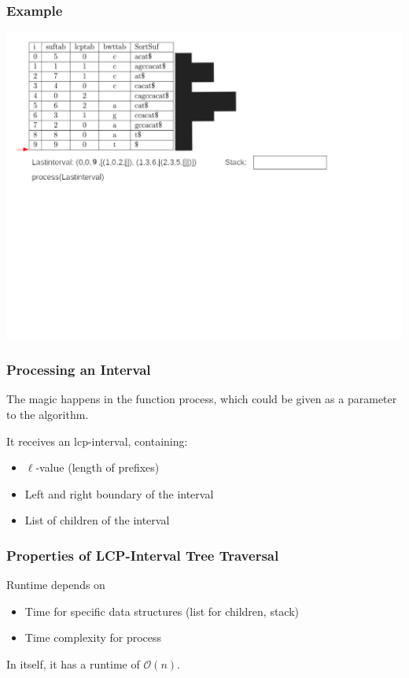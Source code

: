 \documentclass[compress,handout]{beamer} %
\renewcommand{\O}{\mathcal{O}}
\begin{document}
\begin{frame}
	\frametitle{Example}
	\includegraphics[width=\textwidth, height=\textheight, keepaspectratio=true]{traversal_15}
\end{frame}

\begin{frame}
	\frametitle{Processing an Interval}
	The magic happens in the function process, which could be given
	as a parameter to the algorithm.

	It receives an lcp-interval, containing:
	\begin{itemize}
		\item $\ell$-value (length of prefixes)
		\item Left and right boundary of the interval
		\item List of children of the interval
	\end{itemize}
\end{frame}

\begin{frame}
	\frametitle{Properties of LCP-Interval Tree Traversal}
	Runtime depends on
	\begin{itemize}
		\item Time for specific data structures (list for children, stack)
		\item Time complexity for process
	\end{itemize}

	In itself, it has a runtime of $\O(n)$.
\end{frame}
\end{document}
